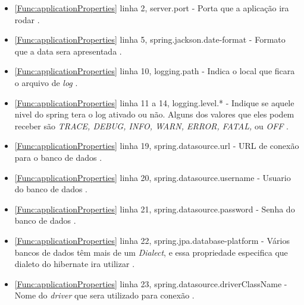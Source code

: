 \begin{itemize}
		\item \autoref{Func:applicationProperties} linha 2, server.port - Porta que a aplicação ira rodar \cite{springBoot:2017}.
		
		\item \autoref{Func:applicationProperties} linha 5, spring.jackson.date-format -  Formato que a data sera apresentada \cite{springBoot:2017}.
		
		\item \autoref{Func:applicationProperties} linha 10, logging.path - Indica o local que ficara o arquivo de \textit{log} \cite{springBoot:2017}.
		
		\item \autoref{Func:applicationProperties} linha 11 a 14, logging.level.* - Indique se aquele nivel do spring tera o log ativado ou não.
		Alguns dos valores que eles podem receber são \textit{TRACE, DEBUG, INFO, WARN, ERROR, FATAL,} ou \textit{OFF} \cite{springBoot:2017}.
		
		\item \autoref{Func:applicationProperties} linha 19, spring.datasource.url - URL de conexão para o banco de dados \cite{springBoot:2017}.
		
		\item \autoref{Func:applicationProperties} linha 20, spring.datasource.username  - Usuario do banco de dados \cite{springBoot:2017}.
		
		\item \autoref{Func:applicationProperties} linha 21, spring.datasource.password  - Senha do banco de dados \cite{springBoot:2017}.
		
		\item \autoref{Func:applicationProperties} linha 22, spring.jpa.database-platform -  Vários bancos de dados têm mais de um \textit{Dialect}, e essa propriedade especifica que dialeto do hibernate ira utilizar \cite{springBoot:2017}.
		
		\item \autoref{Func:applicationProperties} linha 23, spring.datasource.driverClassName -  Nome do \textit{driver} que sera utilizado para conexão \cite{springBoot:2017}.
		
\end{itemize}

